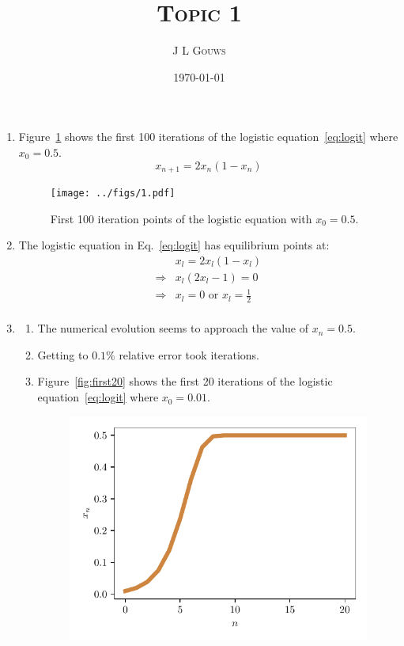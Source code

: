 \documentclass[12pt,a4]{article}
\title{
\textsc{Topic 1}
}
\author{\textsc{J L Gouws}
}
\date{\today
\\[1cm]}
\begin{document}
\thispagestyle{empty}

\maketitle

\begin{enumerate}
  \item
    Figure~\ref{fig:1} shows the first 100 iterations of the logistic equation~\ref{eq:logit} where $x_0 = 0.5$.
    \begin{equation}
      x_{n + 1} = 2 x_{n} (1 - x_{n}) 
      \label{eq:logit}
    \end{equation}
    \begin{figure}[H]
      \centering
      \texttt{[image: ../figs/1.pdf]}
      \caption{First 100 iteration points of the logistic equation with $x_0 = 0.5$.}
      \label{fig:1}
    \end{figure}
  \item
    The logistic equation in Eq.~\ref{eq:logit} has equilibrium points at:
    \begin{align*}
                  & x_{l} = 2 x_{l} (1 - x_{l}) \\
      \Rightarrow & x_l(2 x_{l} - 1 ) = 0 \\
      \Rightarrow & x_l = 0  \text{ or } x_l = \frac{1}{2}\\
    \end{align*}
  \item
    \begin{enumerate}
      \item
        The numerical evolution seems to approach the value of $x_n = 0.5$.
      \item
        Getting to $0.1\%$ relative error took  iterations.
      \item
        Figure~\ref{fig:first20} shows the first 20 iterations of the logistic equation~\ref{eq:logit} where $x_0 = 0.01$.
        \begin{figure}[H]
          \centering
          \includegraphics[scale = 0.8]{../figs/first20.pdf}

\end{figure}
\end{enumerate}
\end{enumerate}
\end{document}
